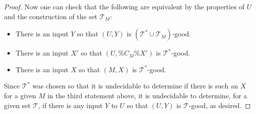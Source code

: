 \documentclass{article}
\newcommand{\Tc}{\mathcal{T}}
\begin{document}
\begin{proof}
Now one can check that the following are equivalent by the properties of $U$ and the construction of the set $\Tc_M$:
\begin{itemize}
    \item There is an input $Y$ so that $(U, Y)$ is $(\Tc^*\cup \Tc_M)$-good.
    \item There is an input $X'$ so that $(U, \%C_M\% X')$ is $\Tc^*$-good.
    \item There is an input $X$ so that $(M, X)$ is $\Tc^*$-good.
\end{itemize}

Since $\Tc^*$ was chosen so that it is undecidable to determine if there is such an $X$ for a given $M$ in the third statement above, it is undecidable to determine, for a given set $\Tc$, if there is any input $Y$ to $U$ so that $(U, Y)$ is $\Tc$-good, as desired.
\end{proof}
\end{document}
